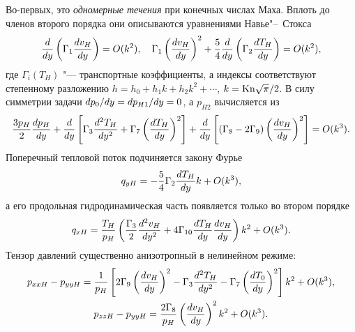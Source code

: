 Во-первых, это \emph{одномерные течения} при конечных числах Маха.
Вплоть до членов второго порядка они описываются уравнениями Навье"--~Стокса
\begin{equation*}
    \der{y}\left(\Gamma_1\der[v_H]{y}\right) = \OO{k^2}, \quad
    \Gamma_1\left(\der[v_H]{y}\right)^2
        + \frac54\der{y}\left(\Gamma_2\der[T_H]{y}\right) = \OO{k^2},
\end{equation*}
где \(\Gamma_i(T_H)\) "--- транспортные коэффициенты,
а индексы соответствуют степенному разложению \(h = h_0 + h_1k + h_2k^2 + \cdots\), \(k=\Kn\sqrt\pi/2\).
В силу симметрии задачи \(\Der[p_0]{y}=\Der[p_{H1}]{y}=0\), а \(p_{H2}\) вычисляется из
\begin{equation*}
    \frac{3p_H}{2}\der[p_H]{y}
        + \der{y}\left[ \Gamma_3 \derdual[T_H]{y} + \Gamma_7\left(\der[T_H]{y}\right)^2 \right]
        + \der{y}\left[ (\Gamma_8-2\Gamma_9)\left(\der[v_H]{y}\right)^2 \right] = \OO{k^3}.
\end{equation*}
Поперечный тепловой поток подчиняется закону Фурье
\begin{equation*}
    q_{yH} = -\frac54\Gamma_2\der[T_H]{y}k + \OO{k^3},
\end{equation*}
а его продольная гидродинамическая часть появляется только во втором порядке
\begin{equation*}
    q_{xH} = \frac{T_H}{p_H}\left( \frac{\Gamma_3}2 \derdual[v_H]{y}
        + 4\Gamma_{10} \der[T_H]{y}\der[v_H]{y} \right)k^2 + \OO{k^3}.
\end{equation*}
Тензор давлений существенно анизотропный в нелинейном режиме:
\begin{gather*}
    p_{xxH} - p_{yyH} = \frac1{p_H}\left[
        2\Gamma_9 \left(\der[v_H]{y}\right)^2 - \Gamma_3\derdual[T_H]{y} - \Gamma_7\left(\der[T_0]{y}\right)^2
    \right]k^2 + \OO{k^3}, \\
    p_{zzH} - p_{yyH} = \frac{2\Gamma_8}{p_H}\left(\der[v_H]{y}\right)^2 k^2 + \OO{k^3}.
\end{gather*}

